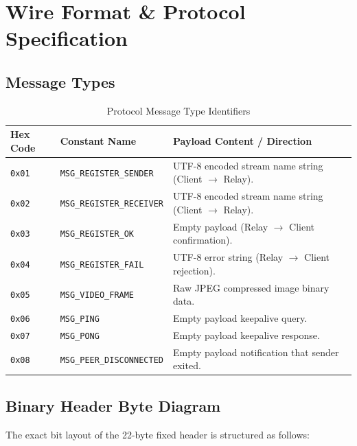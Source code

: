 \documentclass[11pt,a4paper]{article}
\begin{document}
\newpage

\section{Wire Format \& Protocol Specification}


\subsection{Message Types}
\begin{table}[H]
    \centering
    \begin{tabular}{@{}llp{8cm}@{}}
        \toprule
        \textbf{Hex Code} & \textbf{Constant Name} & \textbf{Payload Content / Direction} \\
        \midrule
        \texttt{0x01} & \texttt{MSG\_REGISTER\_SENDER} & UTF-8 encoded stream name string (Client $\rightarrow$ Relay). \\
        \texttt{0x02} & \texttt{MSG\_REGISTER\_RECEIVER} & UTF-8 encoded stream name string (Client $\rightarrow$ Relay). \\
        \texttt{0x03} & \texttt{MSG\_REGISTER\_OK} & Empty payload (Relay $\rightarrow$ Client confirmation). \\
        \texttt{0x04} & \texttt{MSG\_REGISTER\_FAIL} & UTF-8 error string (Relay $\rightarrow$ Client rejection). \\
        \texttt{0x05} & \texttt{MSG\_VIDEO\_FRAME} & Raw JPEG compressed image binary data. \\
        \texttt{0x06} & \texttt{MSG\_PING} & Empty payload keepalive query. \\
        \texttt{0x07} & \texttt{MSG\_PONG} & Empty payload keepalive response. \\
        \texttt{0x08} & \texttt{MSG\_PEER\_DISCONNECTED} & Empty payload notification that sender exited. \\
        \bottomrule
    \end{tabular}
    \caption{Protocol Message Type Identifiers}
\end{table}

\subsection{Binary Header Byte Diagram}
The exact bit layout of the 22-byte fixed header is structured as follows:
\end{document}
